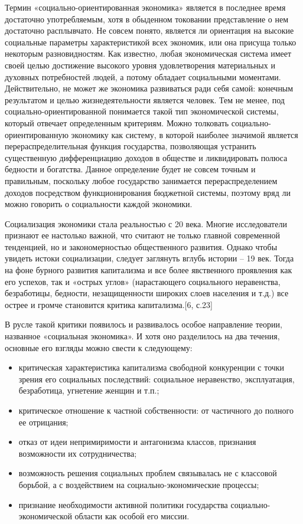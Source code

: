 \documentclass[14pt,a4paper]{article}
\begin{document}
    Термин «социально-ориентированная экономика» является в последнее время достаточно употребляемым, хотя в обыденном токовании представление о нем достаточно расплывчато. Не совсем понято, является ли ориентация на высокие социальные параметры характеристикой всех экономик, или она присуща только некоторым разновидностям. Как известно, любая экономическая система имеет своей целью достижение высокого уровня удовлетворения материальных и духовных потребностей людей, а потому обладает социальными моментами. Действительно, не может же экономика развиваться ради себя самой: конечным результатом и целью жизнедеятельности является человек. Тем не менее, под социально-ориентированной понимается такой тип экономической системы, который отвечает определенным критериям. Можно толковать социально-ориентированную экономику как систему, в которой наиболее значимой является перераспределительная функция государства, позволяющая устранить существенную дифференциацию доходов в обществе и ликвидировать полюса бедности и богатства. Данное определение будет не совсем точным и правильным, поскольку любое государство занимается перераспределением доходов посредством функционирования бюджетной системы, поэтому вряд ли можно говорить о социальности каждой экономики.
    \par
    Социализация экономики стала реальностью с 20 века. Многие исследователи признают ее настолько важной, что считают не только главной современной тенденцией, но и закономерностью общественного развития. Однако чтобы увидеть истоки социализации, следует заглянуть вглубь истории – 19 век. Тогда на фоне бурного развития капитализма и все более явственного проявления как его успехов, так и «острых углов» (нарастающего социального неравенства, безработицы, бедности, незащищенности широких слоев населения и т.д.) все острее и громче становится критика капитализма.[6, с.23]
    \par
    В русле такой критики появилось и развивалось особое направление теории, названное «социальная экономика». И хотя оно разделилось на два течения, основные его взгляды можно свести к следующему:
    \begin{itemize}
        \item критическая характеристика капитализма свободной конкуренции с точки зрения его социальных последствий: социальное неравенство, эксплуатация, безработица, угнетение женщин и т.п.;
        \item критическое отношение к частной собственности: от частичного до полного ее отрицания;
        \item отказ от идеи непримиримости и антагонизма классов, признания возможности их сотрудничества;
        \item возможность решения социальных проблем связывалась не с классовой борьбой, а с воздействием на социально-экономические процессы;
        \item признание необходимости активной политики государства социально-\\экономической области как особой его миссии.
    \end{itemize}
\end{document}
